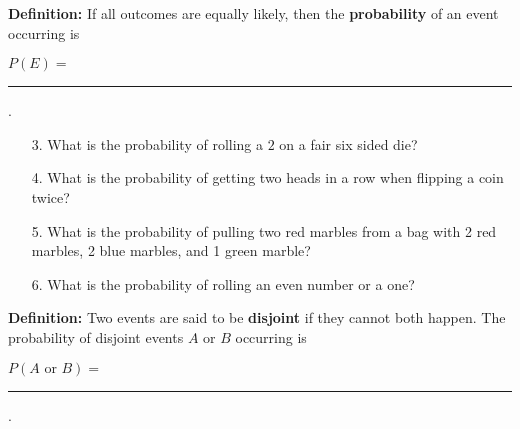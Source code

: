 \documentclass[oneside]{amsart}
\theoremstyle{definition}
\theoremstyle{definition}
\begin{document}
\newpage

\begin{ovalbox}{\begin{minipage}{6.8in}
\vspace{5mm}

\textbf{Definition:} If all outcomes are equally likely, then the \textbf{probability} of an event occurring is  \\
\begin{center}
  $P(E)= $\rule[-7mm]{35mm}{.1mm}.
\end{center}

\vspace{7mm}

\end{minipage}}
\end{ovalbox}

\vspace{5mm}

\begin{itemize}
    \item[3.] What is the probability of rolling a $2$ on a fair six sided die?
    
    \vfill
    
    \item[4.] What is the probability of getting two heads in a row when flipping a coin twice?
    
    \vfill
    
    \item[5.] What is the probability of pulling two red marbles from a bag with 2 red marbles, 2 blue marbles, and 1 green marble?
    
    \vfill

    \item[6.] What is the probability of rolling an even number or a one?
    
    \vfill

     
\end{itemize}

\newpage

\begin{ovalbox}{\begin{minipage}{6.8in}
\vspace{5mm}

\textbf{Definition:} Two events are said to be \textbf{disjoint} if they cannot both happen. The probability of disjoint events $A$ or $B$ occurring is  \\
\begin{center}
  $P(A \text{ or } B)= $\rule[-2mm]{35mm}{.1mm}.
\end{center}

\vspace{7mm}

\end{minipage}}
\end{ovalbox}
\end{document}
